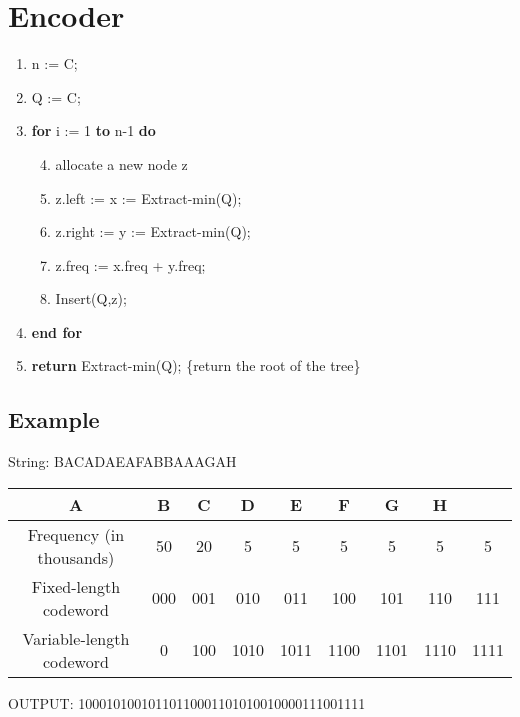 \section{Encoder~\cite{nelson96datacompression}}
\begin{enumerate}
\tightlist
\item
  n := \textbar{}C\textbar{};
\item
  Q := C;
\item
  \textbf{for} i := 1 \textbf{to} n-1 \textbf{do}
  \begin{enumerate}
  \setcounter{enumii}{3}
  \tightlist
  \item
    allocate a new node z
  \item
    z.left := x := Extract-min(Q);
  \item
    z.right := y := Extract-min(Q);
  \item
    z.freq := x.freq + y.freq;
  \item
    Insert(Q,z);
  \end{enumerate}
\item
  \textbf{end for}
\item
  \textbf{return} Extract-min(Q); \{return the root of the tree\}
\end{enumerate}

\subsection{Example}

String: BACADAEAFABBAAAGAH

\begin{tabular}{ccccccccc}
  A & B & C & D & E & F & G & H\\
  \hline
 Frequency (in thousands) & 50 & 20 & 5 & 5 & 5 & 5 & 5 & 5 \\
 Fixed-length codeword & 000 & 001 & 010 & 011 & 100 & 101 & 110 & 111 \\
 Variable-length codeword & 0 & 100 & 1010 & 1011 & 1100 & 1101 & 1110 & 1111
\end{tabular}


OUTPUT: 10001010010110110001101010010000111001111

